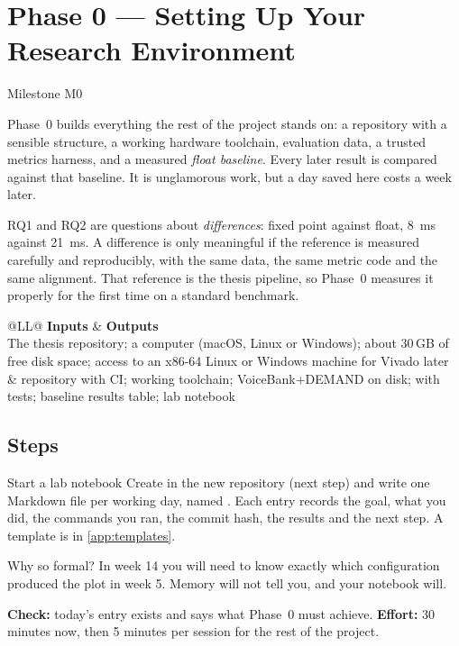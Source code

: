 \chapter{Phase 0 --- Setting Up Your Research Environment}\label{ch:setup}

 \quad Milestone M0

Phase~0 builds everything the rest of the project stands on: a repository with
a sensible structure, a working hardware toolchain, evaluation data, a trusted
metrics harness, and a measured \emph{float baseline}. Every later result is
compared against that baseline. It is unglamorous work, but a day saved here
costs a week later.

\begin{whybox}
RQ1 and RQ2 are questions about \emph{differences}: fixed point against float,
\qty{8}{\ms} against \qty{21}{\ms}. A difference is only meaningful if the
reference is measured carefully and reproducibly, with the same data, the same
metric code and the same alignment. That reference is the thesis pipeline, so
Phase~0 measures it properly for the first time on a standard benchmark.
\end{whybox}

\begin{center}\small
\begin{tabularx}{\textwidth}{@{}LL@{}}
\toprule
\textbf{Inputs} & \textbf{Outputs} \\
\midrule
The thesis repository; a computer (macOS, Linux or Windows); about 30\,GB of
free disk space; access to an x86-64 Linux or Windows machine for Vivado later
&  repository with CI; working toolchain; VoiceBank+DEMAND on
disk;  with tests; baseline results table; lab notebook
\\
\bottomrule
\end{tabularx}
\end{center}

\section{Steps}\label{sec:setup:steps}

\begin{stepbox}[label=st:setup:notebook]{Start a lab notebook}
Create  in the new repository (next step) and write one
Markdown file per working day, named . Each entry records
the goal, what you did, the commands you ran, the commit hash, the results and
the next step. A template is in \cref{app:templates}.

Why so formal? In week 14 you will need to know exactly which configuration
produced the plot in week 5. Memory will not tell you, and your notebook will.

\textbf{Check:} today's entry exists and says what Phase~0 must achieve.
\textbf{Effort:} 30 minutes now, then 5 minutes per session for the rest of the
project.
\end{stepbox}

